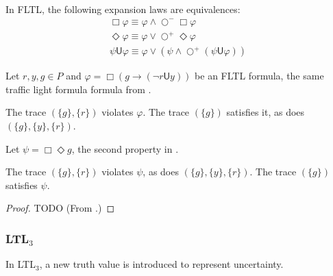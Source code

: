 \documentclass[a4paper]{article}
\newcommand{\U}{\mathsf{U}}
\newcommand{\sn}{\bigcirc^+}
\newcommand{\wn}{\bigcirc^-}
\newcommand{\ltlt}{LTL$_3$}
\begin{document}
\begin{lem}\label{fltlexp}

  In FLTL, the following expansion laws are equivalences:
  \begin{align}
    \Box \varphi \equiv \varphi \land \wn \Box \varphi \label{felBox}\\
    \Diamond \varphi \equiv \varphi \lor \sn \Diamond \varphi\label{felDiamond}\\
    \psi \U \varphi \equiv \varphi \lor (\psi \land \sn (\psi \U \varphi))\label{felU}
  \end{align}

\end{lem}

\begin{eg}\label{fltleg}
  Let $r,y,g\in P$ and $\varphi = \Box (g \to (\neg r \U y))$ be an FLTL formula, the same traffic light formula formula from .

  The trace $(\{g\},\{r\})$ violates $\varphi$. The trace $(\{g\})$ satisfies it, as does $(\{g\},\{y\},\{r\})$.

  Let $\psi = \Box \Diamond g $, the second property in .

  The trace $(\{g\},\{r\})$ violates $\psi$, as does $(\{g\},\{y\},\{r\})$. The trace $(\{g\})$ satisfies $\psi$.

\end{eg}

\begin{proof}
  TODO (From \autocite{bauer2010comparing}.)
\end{proof}

\subsubsection{\ltlt} In \ltlt, a new truth value is introduced to represent uncertainty.
\end{document}
